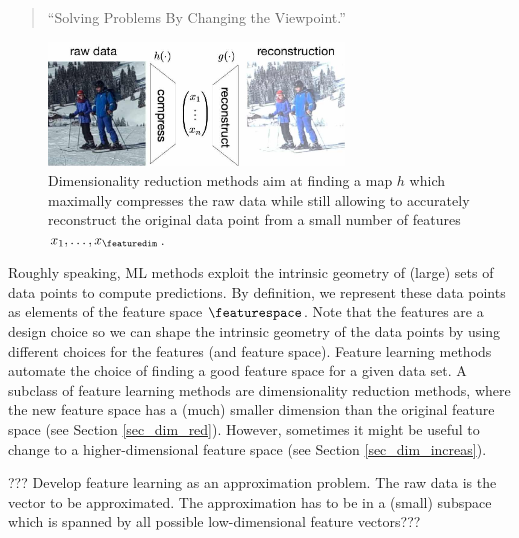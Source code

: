 \documentclass[12pt]{report}
\begin{document}
\begin{quote}
``Solving Problems By Changing the Viewpoint.''
\end{quote}

\begin{figure}[htbp]
\begin{center}
\includegraphics[width=0.7\textwidth]{DimRed.jpg}  
\end{center}
\caption{Dimensionality reduction methods aim at finding a map $h$ which maximally 
	compresses the raw data while still allowing to accurately reconstruct the original 
	data point from a small number of features $x_{1},\ldots,x_{\featuredim}$.}
\label{fig_dimred}
\end{figure}



Roughly speaking, ML methods exploit the intrinsic geometry of (large) sets of 
data points to compute predictions. By definition, we represent these data points 
as elements of the feature space $\featurespace$. Note that the features are 
a design choice so we can shape the intrinsic geometry of the data points by 
using different choices for the features (and feature space). Feature learning 
methods automate the choice of finding a good feature space for a given 
data set. A subclass of feature learning methods are dimensionality reduction methods, 
where the new feature space has a (much) smaller dimension than the original 
feature space (see Section \ref{sec_dim_red}). However, sometimes it might be 
useful to change to a higher-dimensional feature space (see Section \ref{sec_dim_increas}). 


??? Develop feature learning as an approximation problem. The raw data 
is the vector to be approximated. The approximation has to be in a (small) 
subspace which is spanned by all possible low-dimensional feature vectors???

\end{document}
